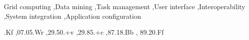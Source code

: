 \documentclass{elsart}
\begin{document}
\begin{frontmatter}
\begin{keyword}
Grid computing \sep Data mining \sep Task management \sep User interface \sep Interoperability
\sep System integration  \sep Application configuration






  .Kf \sep 07.05.Wr \sep 29.50.+v \sep 29.85.+c \sep 87.18.Bb \sep
  89.20.Ff
\end{keyword}
\end{frontmatter}

\end{document}
